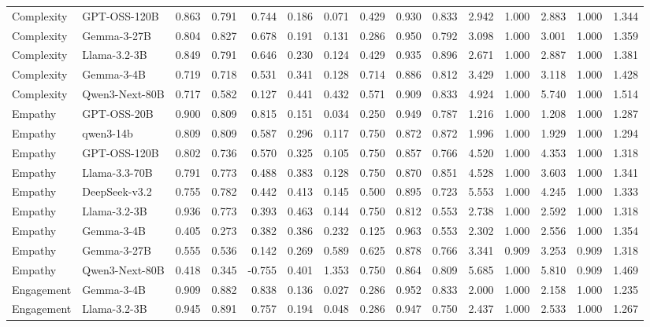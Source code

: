 \begin{table}[t]
{\begin{tabular}{llrrrrrrrrrrrrr}
Complexity & GPT-OSS-120B & 0.863 & 0.791 & 0.744 & 0.186 & 0.071 & 0.429 & 0.930 & 0.833 & 2.942 & 1.000 & 2.883 & 1.000 & 1.344 \\
Complexity & Gemma-3-27B & 0.804 & 0.827 & 0.678 & 0.191 & 0.131 & 0.286 & 0.950 & 0.792 & 3.098 & 1.000 & 3.001 & 1.000 & 1.359 \\
Complexity & Llama-3.2-3B & 0.849 & 0.791 & 0.646 & 0.230 & 0.124 & 0.429 & 0.935 & 0.896 & 2.671 & 1.000 & 2.887 & 1.000 & 1.381 \\
Complexity & Gemma-3-4B & 0.719 & 0.718 & 0.531 & 0.341 & 0.128 & 0.714 & 0.886 & 0.812 & 3.429 & 1.000 & 3.118 & 1.000 & 1.428 \\
Complexity & Qwen3-Next-80B & 0.717 & 0.582 & 0.127 & 0.441 & 0.432 & 0.571 & 0.909 & 0.833 & 4.924 & 1.000 & 5.740 & 1.000 & 1.514 \\
Empathy & GPT-OSS-20B & 0.900 & 0.809 & 0.815 & 0.151 & 0.034 & 0.250 & 0.949 & 0.787 & 1.216 & 1.000 & 1.208 & 1.000 & 1.287 \\
Empathy & qwen3-14b & 0.809 & 0.809 & 0.587 & 0.296 & 0.117 & 0.750 & 0.872 & 0.872 & 1.996 & 1.000 & 1.929 & 1.000 & 1.294 \\
Empathy & GPT-OSS-120B & 0.802 & 0.736 & 0.570 & 0.325 & 0.105 & 0.750 & 0.857 & 0.766 & 4.520 & 1.000 & 4.353 & 1.000 & 1.318 \\
Empathy & Llama-3.3-70B & 0.791 & 0.773 & 0.488 & 0.383 & 0.128 & 0.750 & 0.870 & 0.851 & 4.528 & 1.000 & 3.603 & 1.000 & 1.341 \\
Empathy & DeepSeek-v3.2 & 0.755 & 0.782 & 0.442 & 0.413 & 0.145 & 0.500 & 0.895 & 0.723 & 5.553 & 1.000 & 4.245 & 1.000 & 1.333 \\
Empathy & Llama-3.2-3B & 0.936 & 0.773 & 0.393 & 0.463 & 0.144 & 0.750 & 0.812 & 0.553 & 2.738 & 1.000 & 2.592 & 1.000 & 1.318 \\
Empathy & Gemma-3-4B & 0.405 & 0.273 & 0.382 & 0.386 & 0.232 & 0.125 & 0.963 & 0.553 & 2.302 & 1.000 & 2.556 & 1.000 & 1.354 \\
Empathy & Gemma-3-27B & 0.555 & 0.536 & 0.142 & 0.269 & 0.589 & 0.625 & 0.878 & 0.766 & 3.341 & 0.909 & 3.253 & 0.909 & 1.318 \\
Empathy & Qwen3-Next-80B & 0.418 & 0.345 & -0.755 & 0.401 & 1.353 & 0.750 & 0.864 & 0.809 & 5.685 & 1.000 & 5.810 & 0.909 & 1.469 \\
Engagement & Gemma-3-4B & 0.909 & 0.882 & 0.838 & 0.136 & 0.027 & 0.286 & 0.952 & 0.833 & 2.000 & 1.000 & 2.158 & 1.000 & 1.235 \\
Engagement & Llama-3.2-3B & 0.945 & 0.891 & 0.757 & 0.194 & 0.048 & 0.286 & 0.947 & 0.750 & 2.437 & 1.000 & 2.533 & 1.000 & 1.267 \\

\end{tabular}}
\end{table}
